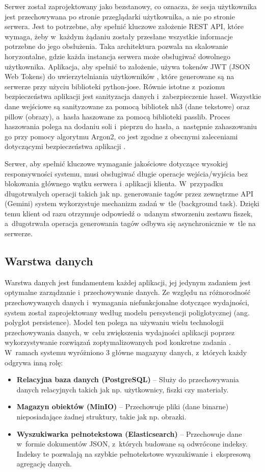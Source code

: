 Serwer został zaprojektowany jako bezstanowy, co oznacza, że sesja użytkownika jest przechowywana po stronie przeglądarki użytkownika, 
a nie po stronie serwera. Jest to potrzebne, aby spełnić kluczowe założenie REST API, które wymaga, żeby w~każdym żądaniu zostały przesłane 
wszystkie informacje potrzebne do jego obsłużenia. Taka architektura pozwala na skalowanie horyzontalne, gdzie każda instancja serwera może 
obsługiwać dowolnego użytkownika. Aplikacja, aby spełnić to założenie, używa tokenów JWT (JSON Web Tokens) do uwierzytelniania użytkowników \cite{rfc7519}, które 
generowane są na serwerze przy użyciu biblioteki python-jose. Równie istotne z~poziomu bezpieczeństwa aplikacji jest sanityzacja danych i~zabezpieczenie haseł. 
Wszystkie dane wejściowe są sanityzowane za pomocą bibliotek nh3 (dane tekstowe) oraz pillow (obrazy), a~hasła haszowane 
za pomocą biblioteki passlib. Proces haszowania polega na dodaniu soli i~pieprzu do hasła, a~następnie zahaszowaniu go przy pomocy algorytmu Argon2, co jest zgodne 
z obecnymi zaleceniami dotyczącymi bezpieczeństwa aplikacji \cite{owasp_passwords}.

Serwer, aby spełnić kluczowe wymaganie jakościowe dotyczące wysokiej responsywności systemu, musi obsługiwać długie operacje wejścia/wyjścia bez blokowania 
głównego wątku serwera i~aplikacji klienta. W~przypadku długotrwałych operacji takich jak np. generowanie tagów przez zewnętrzne API (Gemini) system 
wykorzystuje mechanizm zadań w~tle (background task). Dzięki temu klient od razu otrzymuje odpowiedź o~udanym stworzeniu zestawu fiszek, a~długotrwała 
operacja generowania tagów odbywa się asynchronicznie w~tle na serwerze.
\subsection{Warstwa danych}

Warstwa danych jest fundamentem każdej aplikacji, jej jedynym zadaniem jest optymalne zarządzanie i~przechowywanie danych.
Ze względu na różnorodność przechowywanych danych i~wymagania niefunkcjonalne dotyczące 
wydajności, system został zaprojektowany według modelu persystencji poliglotycznej (ang. polyglot persistence). 
Model ten polega na używaniu wielu technologii przechowywania danych, w~celu zwiększenia wydajności aplikacji
poprzez wykorzystywanie rozwiązań zoptymalizowanych pod konkretne zadania \cite{nosql_distilled}. W~ramach systemu wyróżniono 3 główne 
magazyny danych, z~których każdy odgrywa inną rolę:
\begin{itemize}
    \item \textbf{Relacyjna baza danych (PostgreSQL)} -- Służy do przechowywania danych relacyjnych takich jak np. użytkownicy, 
    fiszki czy materiały.
    \item \textbf{Magazyn obiektów (MinIO)} -- Przechowuje pliki (dane binarne) nieposiadające żadnej struktury, takie jak np. obrazki.
    \item \textbf{Wyszukiwarka pełnotekstowa (Elasticsearch)} -- Przechowuje dane w~formie dokumentów JSON, z~których budowane są odwrócone
     indeksy. Indeksy te pozwalają na szybkie pełnotekstowe wyszukiwanie i~ekspresową agregację danych.
\end{itemize}

